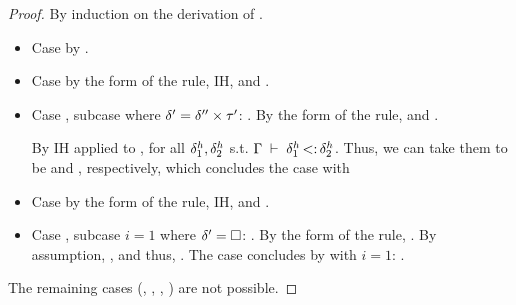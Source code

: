 \begin{proof}
    By induction on the derivation of
    .
    \begin{itemize}
        \item Case  by .
        \item Case  by the form of the rule, IH, and .
        \item Case , subcase where
            $\delta' = \delta'' \times \tau'$:
                {}.
            By the form of the rule,
             and
            . 
            
            By IH applied to 
            ,
                {\tyunion
                    {}
                    {}
                }
            for all $\delta^h_1, \delta^h_2$ s.t. $\Gamma\;\vdash\;\delta^h_1 \operatorname{<:} \delta^h_2$.
            Thus, we can take them to be  
            and , 
            respectively, which concludes the case with
                {\tyunion
                    {}
                    {}
                }
        \item Case  by the form of the rule, IH, and .
        \item Case , subcase $i = 1$ where $\delta' = \square$:
            .
            By the form of the rule, \subtydflt{}.
            By assumption, , and thus,
            .
            The case concludes by  with $i=1$:
                {}.
    \end{itemize}
    The remaining cases 
    (, , , ) 
    are not possible.
\end{proof}

